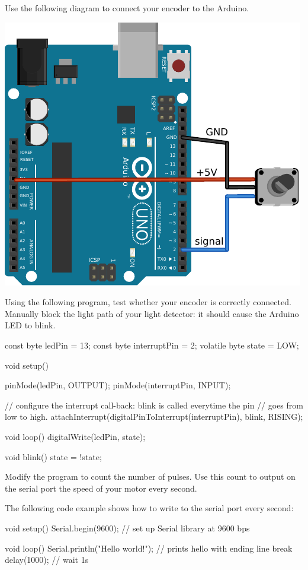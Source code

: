 \documentclass{instructions}
\begin{document}

Use the following diagram to connect your encoder to the Arduino.

\begin{center}
\includegraphics[width=0.6\linewidth]{arduino-encoder}
\end{center}

Using the following program, test whether your encoder is correctly connected. Manually block the light path of your light detector: it should cause the Arduino LED to blink.

\begin{cppcode}
const byte ledPin = 13;
const byte interruptPin = 2;
volatile byte state = LOW;

void setup() {
  pinMode(ledPin, OUTPUT);
  pinMode(interruptPin, INPUT);

  // configure the interrupt call-back: blink is called everytime the pin 
  // goes from low to high.
  attachInterrupt(digitalPinToInterrupt(interruptPin), blink, RISING);
}

void loop() {
  digitalWrite(ledPin, state);
}

void blink() {
  state = !state;
}
\end{cppcode}




Modify the program to count the number of pulses. Use this count to output on
the serial port the speed of your motor every second.

The following code example shows how to write to the serial port every second:

\begin{cppcode}
void setup()
{
  Serial.begin(9600);           // set up Serial library at 9600 bps
}

void loop()
{
  Serial.println("Hello world!");  // prints hello with ending line break 
  delay(1000);                     // wait 1s
}
\end{cppcode}
\end{document}
